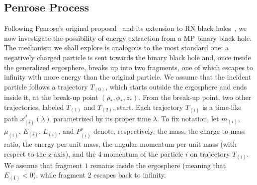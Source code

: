 \subsection{Penrose Process}

Following Penrose's original proposal~\cite{PENROSE1971} and its extension to RN black holes~\cite{RUFFINI1971,DENARDO1973}, we now investigate the possibility of energy extraction from a MP binary black hole. The mechanism we shall explore is analogous to the most standard one: a negatively charged particle is sent towards the binary black hole and, once inside the generalized ergosphere, breaks up into two fragments, one of which escapes to infinity with more energy than the original particle. We assume that the incident particle follows a trajectory $T_{(0)}$, which starts outside the ergosphere and ends inside it, at the break-up point $(\rho_*,\phi_*,z_*)$. From the break-up point, two other trajectories, labeled $T_{(1)}$ and $T_{(2)}$, start. Each trajectory $T_{(i)}$ is a time-like path $x^{\mu}_{(i)}(\lambda)$ parametrized by its proper time $\lambda$. To fix notation, let $m_{(i)}$, $\mu_{(i)}$, $E_{(i)}$, $L_{(i)}$, and $P^{\mu}_{(i)}$ denote, respectively, the mass, the charge-to-mass ratio, the energy per unit mass, the angular momentum per unit mass (with respect to the z-axis), and the 4-momentum of the particle $i$ on trajectory $T_{(i)}$. We assume that fragment $1$ remains inside the ergosphere (meaning that $E_{(1)} < 0 $), while fragment $2$ escapes back to infinity.


